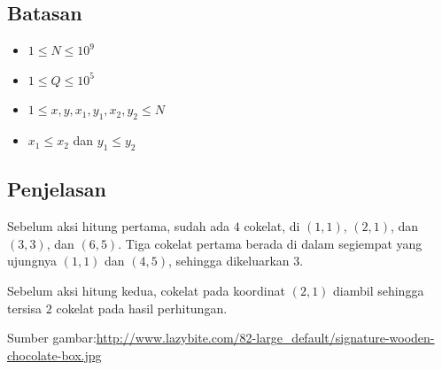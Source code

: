 \documentclass{article}
\begin{document}
\subsection*{Batasan}

\begin{itemize}
  \item $1 \leq N \leq 10^9$
  \item $1 \leq Q \leq 10^5$
  \item $1 \leq x, y, x_1, y_1, x_2, y_2 \leq N$
  \item $x_1 \leq x_2$ dan $y_1 \leq y_2$
\end{itemize}

\subsection*{Penjelasan}

\par\noindent Sebelum aksi hitung pertama, sudah ada $4$ cokelat, di $(1,1)$, $(2,1)$, dan $(3,3)$, dan $(6,5)$. Tiga cokelat pertama berada di dalam segiempat yang ujungnya $(1,1)$ dan $(4,5)$, sehingga dikeluarkan $3$.

\par\noindent Sebelum aksi hitung kedua, cokelat pada koordinat $(2,1)$ diambil sehingga tersisa $2$ cokelat pada hasil perhitungan.

\par\noindent Sumber gambar:\url{http://www.lazybite.com/82-large_default/signature-wooden-chocolate-box.jpg}
\end{document}

